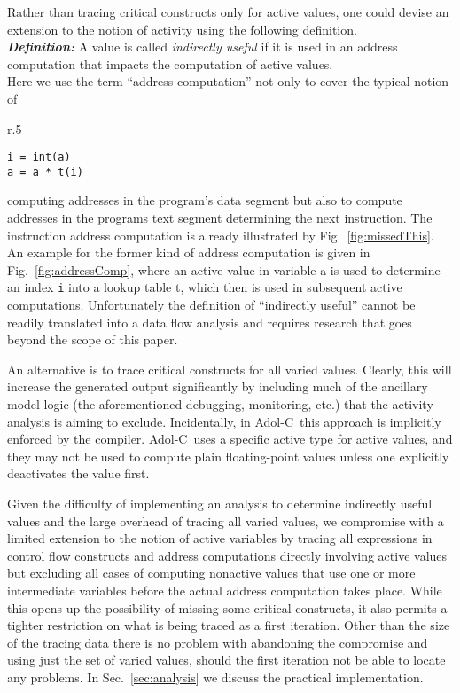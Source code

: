 \documentclass{article}
\newcommand{\adolc}{\mbox{Adol-C}}
\newcommand{\refsec}[1]{{Sec.~\ref{#1}}}
\newcommand{\reffig}[1]{{Fig.~\ref{#1}}}
\begin{document}
Rather than tracing critical constructs only for  active values, 
one could devise an extension to the notion of activity using the following 
definition.\\
{\bf\em  Definition: } A value is called {\em indirectly useful} 
if it is used in an address computation that impacts 
the  computation of active values.\\
Here we use the term  ``address computation'' not only  to cover the typical notion of 
\begin{wrapfigure}{r}{.5\textwidth}
\begin{minipage}{.95\linewidth}
\begin{lstlisting}[frame=single]
i = int(a) 
a = a * t(i)
\end{lstlisting}
\end{minipage}
\caption{An address computation into a lookup table impacting the subsequent computation}\label{fig:addressComp} 
\end{wrapfigure}
computing addresses in the program's data segment but also to compute 
addresses in the programs text segment determining the next instruction. 
The instruction address computation is already illustrated by \reffig{fig:missedThis}.
An example for the former kind of address computation is given in 
\reffig{fig:addressComp}, where an active value in variable a is used to 
determine an index \lstinline{i} into a lookup table t,
which then is used in 
subsequent active computations.
Unfortunately the definition of ``indirectly useful'' cannot be readily translated  into a data flow analysis and requires research that goes beyond the scope of this paper.   

An alternative is  to  trace critical constructs for all varied values. 
Clearly, this will increase the generated output significantly by including much 
of the ancillary model logic (the aforementioned debugging, monitoring, etc.) that 
the activity analysis is aiming to exclude. 
Incidentally, in \adolc\ this approach is implicitly enforced by the compiler. 
\adolc\ uses a specific  
active type for active values, and they may not be used to 
compute plain floating-point values unless one 
explicitly deactivates the value first. 

Given the difficulty of implementing an analysis to determine indirectly useful values 
and the large overhead of tracing all varied values, we 
compromise with a limited extension to the notion of active variables by tracing  
all expressions in control flow constructs and address computations directly involving active values
but excluding all cases of computing nonactive values that use one or more intermediate 
variables before the actual address computation takes place. 
While this opens up the possibility of missing some critical constructs, 
it also permits a tighter restriction on what is being traced as a first iteration. 
Other than the size of the tracing data  there is no problem with abandoning the compromise
and using just the set of varied values, should the first iteration not be able to 
locate any problems.    
In \refsec{sec:analysis} we discuss the practical implementation.
\end{document}
